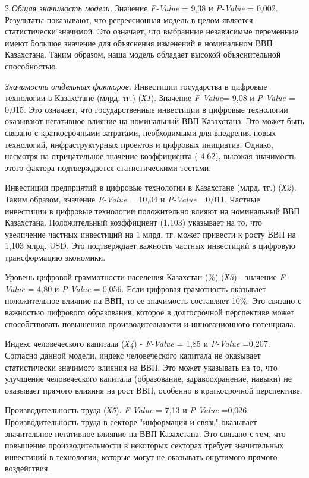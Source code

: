 \begin{multicols}{2}
\emph{Общая значимость модели.} Значение \emph{F-Value} = 9,38 и
\emph{P-Value} = 0,002. Результаты показывают, что регрессионная модель
в целом является статистически значимой. Это означает, что выбранные
независимые переменные имеют большое значение для объяснения изменений в
номинальном ВВП Казахстана. Таким образом, наша модель обладает высокой
объяснительной способностью.

\emph{Значимость отдельных факторов}. Инвестиции государства в цифровые
технологии в Казахстане (млрд. тг.) (\emph{Х1}). Значение
\emph{F-Value}= 9,08 и \emph{P-Value} = 0,015. Это означает, что
государственные инвестиции в цифровые технологии оказывают негативное
влияние на номинальный ВВП Казахстана. Это может быть связано с
краткосрочными затратами, необходимыми для внедрения новых технологий,
инфраструктурных проектов и цифровых инициатив. Однако, несмотря на
отрицательное значение коэффициента (-4,62), высокая значимость этого
фактора подтверждается статистическими тестами.

Инвестиции предприятий в цифровые технологии в Казахстане (млрд. тг.)
(\emph{Х2}). Таким образом, значение \emph{F-Value} = 10,04 и
\emph{P-Value} =0,011. Частные инвестиции в цифровые технологии
положительно влияют на номинальный ВВП Казахстана. Положительный
коэффициент (1,103) указывает на то, что увеличение частных инвестиций
на 1 млрд. тг. может привести к росту ВВП на 1,103 млрд. USD. Это
подтверждает важность частных инвестиций в цифровую трансформацию
экономики.

Уровень цифровой граммотности населения Казахстан (\%) (\emph{Х3}) -
значение \emph{F-Value} = 4,80 и \emph{P-Value} = 0,056. Если цифровая
грамотность оказывает положительное влияние на ВВП, то ее значимость
составляет 10\%. Это связано с важностью цифрового образования, которое
в долгосрочной перспективе может способствовать повышению
производительности и инновационного потенциала.

Индекс человеческого капитала (\emph{Х4}) - \emph{F-Value} = 1,85 и
\emph{P-Value} =0,207. Согласно данной модели, индекс человеческого
капитала не оказывает статистически значимого влияния на ВВП. Это может
указывать на то, что улучшение человеческого капитала (образование,
здравоохранение, навыки) не оказывает прямого влияния на рост ВВП,
особенно в краткосрочной перспективе.

Производительность труда (\emph{Х5}). \emph{F-Value} = 7,13 и
\emph{P-Value} =0,026. Производительность труда в секторе "информация и
связь" оказывает значительное негативное влияние на ВВП Казахстана. Это
связано с тем, что повышение производительности в некоторых секторах
требует значительных инвестиций в технологии, которые могут не оказывать
ощутимого прямого воздействия.


\end{multicols}
